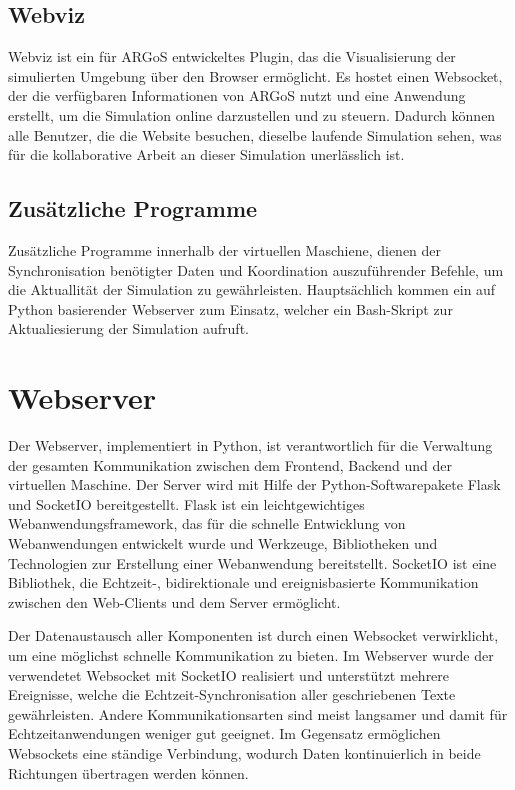 \documentclass[german,version-2020-11]{uzl-thesis}
\begin{document}
  \subsection{Webviz}
  \label{webviz}
  Webviz ist ein für ARGoS entwickeltes Plugin\cite{ARGoS3-Webviz}, das die Visualisierung der simulierten Umgebung über den Browser ermöglicht. 
  Es hostet einen Websocket, der die verfügbaren Informationen von ARGoS nutzt und eine Anwendung erstellt, um die Simulation online darzustellen und zu steuern. 
  Dadurch können alle Benutzer, die die Website besuchen, dieselbe laufende Simulation sehen, was für die kollaborative Arbeit an dieser Simulation unerlässlich ist.

  \subsection{Zusätzliche Programme}
  Zusätzliche Programme innerhalb der virtuellen Maschiene, dienen der Synchronisation benötigter Daten und Koordination auszuführender Befehle, um die Aktuallität der Simulation zu gewährleisten.
  Hauptsächlich kommen ein auf Python basierender Webserver zum Einsatz, welcher ein Bash-Skript zur Aktualiesierung der Simulation aufruft.


\section{Webserver}
  Der Webserver, implementiert in Python, ist verantwortlich für die Verwaltung der gesamten Kommunikation 
  zwischen dem Frontend, Backend und der virtuellen Maschine.
  Der Server wird mit Hilfe der Python-Softwarepakete Flask und SocketIO bereitgestellt. 
  Flask ist ein leichtgewichtiges Webanwendungsframework, das für die schnelle Entwicklung von Webanwendungen entwickelt wurde und Werkzeuge, 
  Bibliotheken und Technologien zur Erstellung einer Webanwendung bereitstellt. 
  SocketIO ist eine Bibliothek, die Echtzeit-, bidirektionale und ereignisbasierte Kommunikation zwischen den Web-Clients und dem Server ermöglicht.

  Der Datenaustausch aller Komponenten ist durch einen Websocket verwirklicht, um eine möglichst schnelle Kommunikation zu bieten. 
  Im Webserver wurde der verwendetet Websocket mit SocketIO realisiert und unterstützt mehrere Ereignisse, 
  welche die Echtzeit-Synchronisation aller geschriebenen Texte gewährleisten.
  Andere Kommunikationsarten sind meist langsamer und damit für Echtzeitanwendungen weniger gut geeignet.
  Im Gegensatz ermöglichen Websockets eine ständige Verbindung, wodurch Daten kontinuierlich in beide Richtungen übertragen werden können.
  
\end{document}
